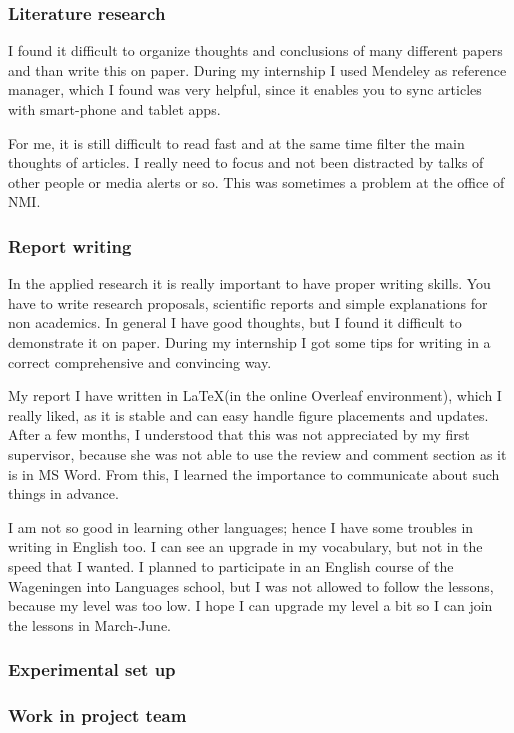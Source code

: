 \documentclass[10pt,twoside,dutch,english]{report}
\begin{document}
\subsubsection{Literature research}
I found it difficult to organize thoughts and conclusions of many different papers and than write this on paper. During my internship I used Mendeley as reference manager, which I found was very helpful, since it enables you to sync articles with smart-phone and tablet apps. 

For me, it is still difficult to read fast and at the same time filter the main thoughts of articles. I really need to focus and not been distracted by talks of other people or media alerts or so. This was sometimes a problem at the office of NMI.

\subsubsection{Report writing }
In the applied research it is really important to have proper writing skills. You have to write research proposals, scientific reports and simple explanations for non academics. In general I have good thoughts, but I found it difficult to demonstrate it on paper. During my internship I got some tips for writing in a correct comprehensive and convincing way.  

My report I have written in \LaTeX  (in the online Overleaf environment), which I really liked, as it is stable and can easy handle figure placements and updates. After a few months, I understood that this was not appreciated by my first supervisor, because she was not able to use the review and comment section as it is in MS Word. From this, I learned the importance to communicate about such things in advance. 

I am not so good in learning other languages; hence I have some troubles in writing in English too. I can see an upgrade in my vocabulary, but not in the speed that I wanted. I planned to participate in an English course of the Wageningen into Languages school, but I was not allowed to follow the lessons, because my level was too low. I hope I can upgrade my level a bit so I can join the lessons in March-June. 

\subsubsection{Experimental set up}


\subsubsection{Work in project team}
\end{document}
